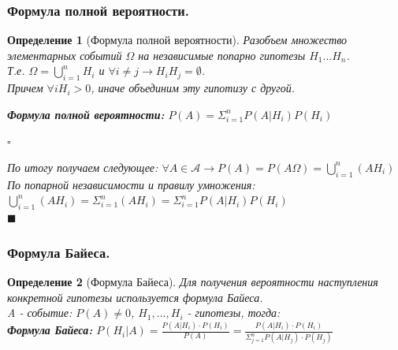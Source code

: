 \documentclass[14pt]{extarticle}
\theoremstyle{breakstyle}
\newtheorem{definition}{Определение}[subsection]
\begin{document}
\subsubsection{Формула полной вероятности.}
\begin{definition}[Формула полной вероятности]

Разобъем множество элементарных событий $\Omega$ на независимые попарно гипотезы $H_{1} ... H_{n}$. \\
Т.е. $\Omega = \bigcup_{i=1}^{n}H_{i}$ и $\forall i \neq j \rightarrow H_{i}H_{j} = \emptyset$. \\
Причем $\forall i H_{i} > 0$, иначе объединим эту гипотизу с другой. \\

\vspace{1em}

\textbf{Формула полной вероятности:} $P(A) = \Sigma_{i=1}^{n}P(A | H_{i})P(H_{i})$

$\square$

По итогу получаем следующее: $\forall A \in \mathscr{A} \rightarrow P(A) = P(A \Omega) = \bigcup_{i=1}^{n}(AH_{i})$ \\
По попарной независимости и правилу умножения: $\bigcup_{i=1}^{n}(AH_{i}) = \Sigma_{i=1}^{n}(AH_{i}) = \Sigma_{i=1}^{n}P(A | H_{i})P(H_{i})$ \\

\hfill$\blacksquare$

\end{definition}

\subsubsection{Формула Байеса.}
\begin{definition}[Формула Байеса]

Для получения вероятности наступления конкретной гипотезы используется формула Байеса. \\

A - событие: $P(A) \neq 0$, $H_{1}, ... , H_{i}$ - гипотезы, тогда: \\
\textbf{Формула Байеса:} $P(H_{i} | A) = \frac{P(A | H_{i}) \cdot P(H_{i})}{P(A)} = \frac{P(A | H_{i}) \cdot P(H_{i})}{\Sigma_{j=1}^{n}P(A | H_{j}) \cdot P(H_{j})}$

\end{definition}
\end{document}
